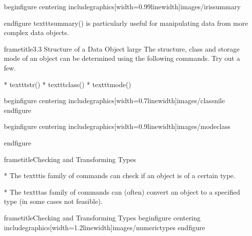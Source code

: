  	
 	
 		
 		
 		begin{figure}
 			centering
 			includegraphics[width=0.99linewidth]{images/irissummary}
 			
 		end{figure}
 		texttt{summary()} is particularly useful for manipulating data from more complex data objects.
 		
 	
 	
 		
 		frametitle{3.3 Structure of a Data Object}
 		large
 		The structure, class and storage mode of an object can be determined using the following
 		commands. Try out a few.
 		
 			          * texttt{str()}
 			          * texttt{class()}
 			          * texttt{mode()}
 		
 		
 		
 	
 	
 		begin{figure}
 			centering
 			includegraphics[width=0.7linewidth]{images/classnile}
 		end{figure}
 		
 		
 	
 	
 		begin{figure}
 			centering
 			includegraphics[width=0.9linewidth]{images/modeclass}
 			
 		end{figure}
 		
 		
 	
 	
 		
 			frametitle{Checking and Transforming Types}	
 			
 			
 			         * The texttt{is} family of commands can check if an object is of a certain type.

         * The texttt{as} family of commands can (often) convert an object to a specified type (in some cases not feasible). 			

 		
 		
 		
 		
 				frametitle{Checking and Transforming Types}	
 			begin{figure}
 				centering
 				includegraphics[width=1.2linewidth]{images/numerictypes}    
 			end{figure}
 		 
